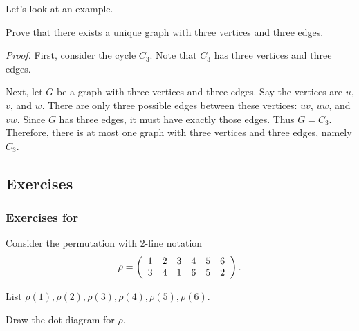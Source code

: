 Let's look at an example.

\begin{exam}
\label{exam_exist_unique}
    Prove that there exists a unique graph with three vertices and three edges.

        \emph{Proof.}  First, consider the cycle $C_3$.  Note that $C_3$ has three vertices and three edges.

        Next, let $G$ be a graph with three vertices and three edges. Say the vertices are $u$, $v$, and $w$.  There are only three possible edges between these vertices: $uv$, $uw$, and $vw$.  Since $G$ has three edges, it must have exactly those edges.  Thus $G = C_3$.  Therefore, there is at most one graph with three vertices and three edges, namely $C_3$.
\end{exam}


\subsection{Exercises}


\subsubsection*{Exercises for  \subperms}

\begin{exer}[\exerP] %
\label{exer_perm_rho}
    Consider the permutation with 2-line notation $$\rho = \displaystyle \left ( \begin{array} {ccc ccc} 1 & 2 & 3 & 4 & 5 & 6 \\ 3 & 4 & 1 & 6 & 5 & 2\\ \end{array} \right ).$$
        \begin{exerpart}
            \item List $\rho(1), \rho(2), \rho(3), \rho(4),
            \rho(5), \rho(6)$.
            \item Draw the dot diagram for $\rho$.
        \end{exerpart}
\end{exer}

